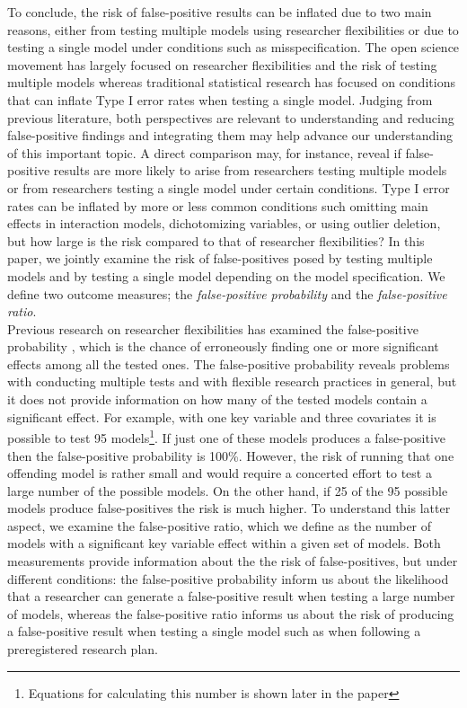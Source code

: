 To conclude, the risk of false-positive results can be inflated due to two main reasons, either from testing multiple models using researcher flexibilities or due to testing a single model under conditions such as misspecification. The open science movement has largely focused on researcher flexibilities and the risk of testing multiple models whereas traditional statistical research has focused on conditions that can inflate Type I error rates when testing a single model. Judging from previous literature, both perspectives are relevant to understanding and reducing false-positive findings and integrating them may help advance our understanding of this important topic. A direct comparison may, for instance, reveal if false-positive results are more likely to arise from researchers testing multiple models or from researchers testing a single model under certain conditions. Type I error rates can be inflated by more or less common conditions such omitting main effects in interaction models, dichotomizing variables, or using outlier deletion, but how large is the risk compared to that of researcher flexibilities? In this paper, we jointly examine the risk of false-positives posed by testing multiple models and by testing a single model depending on the model specification. We define two outcome measures; the \textit{false-positive probability} and the \textit{false-positive ratio}. \\
Previous research on researcher flexibilities has examined the false-positive probability \citep{Simmons2011}, which is the chance of erroneously finding one or more significant effects among all the tested ones. The false-positive probability reveals problems with conducting multiple tests and with flexible research practices in general, but it does not provide information on how many of the tested models contain a significant effect. For example, with one key variable and three covariates it is possible to test 95 models\footnote{Equations for calculating this number is shown later in the paper}. If just one of these models produces a false-positive then the false-positive probability is 100\%. However, the risk of running that one offending model is rather small and would require a concerted effort to test a large number of the possible models. On the other hand, if 25 of the 95 possible models produce false-positives the risk is much higher. To understand this latter aspect, we examine the false-positive ratio, which we define as the number of models with a significant key variable effect within a given set of models. Both measurements provide information about the the risk of false-positives, but under different conditions: the false-positive probability inform us about the likelihood that a researcher can generate a false-positive result when testing a large number of models, whereas the false-positive ratio informs us about the risk of producing a false-positive result when testing a single model such as when following a preregistered research plan. \\

